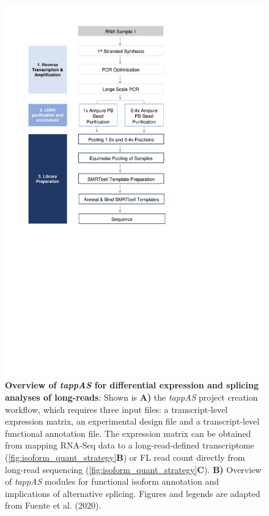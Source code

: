 \begin{figure}[htp]
	\begin{center}
		\includegraphics[page=21,trim={0cm 5cm 0 0cm},clip, scale = 0.8]{Figures/ProjectDevelopment_Figures.pdf}
	\end{center}
	\captionsetup{width=0.95\textwidth,singlelinecheck=off}
	\caption[Overview of \textit{tappAS} for differential expression and splicing analyses of long-reads]%
	{\textbf{Overview of \textit{tappAS} for differential expression and splicing analyses of long-reads}: Shown is \textbf{A)} the \textit{tappAS} project creation workflow, which requires three input files: a transcript-level expression matrix, an experimental design file and a transcript-level functional annotation file. The expression matrix can be obtained from mapping RNA-Seq data to a long-read-defined transcriptome (\cref{fig:isoform_quant_strategy}\textbf{B}) or FL read count directly from long-read sequencing (\cref{fig:isoform_quant_strategy}\textbf{C}). \textbf{B)} Overview of \textit{tappAS} modules for functional isoform annotation and implications of alternative splicing. Figures and legends are adapted from Fuente et al. (2020)\cite{DeLaFuente2020}.
	}
	\label{fig:tappAS_overview}
\end{figure}


